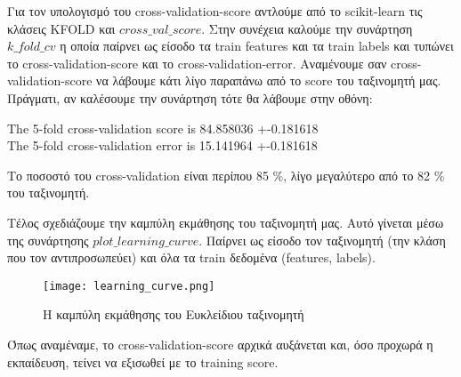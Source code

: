 \documentclass[11pt]{article} %
\begin{document}
Για τον υπολογισμό του cross-validation-score αντλούμε από το scikit-learn τις κλάσεις ΚFOLD και $cross\_val\_score$. Στην συνέχεια καλούμε την συνάρτηση $k\_fold\_cv$ η οποία παίρνει ως είσοδο τα train features και τα train labels και τυπώνει το cross-validation-score και το cross-validation-error. Αναμένουμε σαν cross-validation-score να λάβουμε κάτι λίγο παραπάνω από το score του ταξινομητή μας. Πράγματι, αν καλέσουμε την συνάρτηση τότε θα λάβουμε στην οθόνη:
\begin{center}
The 5-fold cross-validation score is 84.858036 +-0.181618\\
The 5-fold cross-validation error is 15.141964 +-0.181618
\end{center}

Το ποσοστό του cross-validation είναι περίπου 85 \%, λίγο μεγαλύτερο από το 82 \% του ταξινομητή.



Τέλος σχεδιάζουμε την καμπύλη εκμάθησης του ταξινομητή μας. Αυτό γίνεται μέσω της συνάρτησης $plot\_learning\_curve$. Παίρνει ως είσοδο τον ταξινομητή (την κλάση που τον αντιπροσωπεύει) και όλα τα train δεδομένα (features, labels). 

\begin{figure}[H]
    \centering
    \texttt{[image: learning\_curve.png]}
    \caption{Η καμπύλη εκμάθησης του Ευκλείδιου ταξινομητή}
    \label{fig:learningcurve}
\end{figure}

Όπως αναμέναμε, το cross-validation-score αρχικά αυξάνεται και, όσο προχωρά η εκπαίδευση, τείνει να εξισωθεί με το training score.
\end{document}
